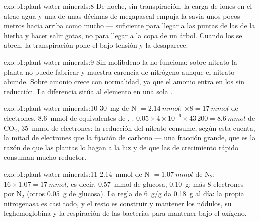 \begin{solution}{exo:b1:plant-water-minerals:8}
De noche, sin transpiración, la carga de iones en el  atrae agua y una
 de unas décimas de megapascal empuja la savia unos pocos
metros hacia arriba como mucho --- suficiente para llegar a las puntas de
las  de la hierba y hacer salir gotas, no para llegar a la copa de un
árbol. Cuando los  se abren, la transpiración pone el  bajo
tensión y la  desaparece.
\end{solution}

\begin{solution}{exo:b1:plant-water-minerals:9}
Sin molibdeno la  no funciona: sobre nitrato la planta no
puede fabricar  y muestra carencia de nitrógeno aunque el nitrato
abunde. Sobre amonio crece con normalidad, ya que el amonio entra en los
 sin reducción. La diferencia sitúa al elemento en una sola
.
\end{solution}

\begin{solution}{exo:b1:plant-water-minerals:10}
\qty{30}{mg} de N $= \qty{2.14}{mmol}$; $\times 8 = \qty{17}{mmol}$ de
electrones, \qty{8.6}{mmol} de equivalentes de . : $0.05\times
4\times 10^{-6}\times 43\,200 = \qty{8.6}{mmol}$ de $\mathrm{CO_2}$,
\qty{35}{mmol} de electrones: la reducción del nitrato consume, según esta
cuenta, la mitad de electrones que la fijación de carbono --- una fracción
grande, que es la razón de que las plantas lo hagan a la luz y de que las
 de crecimiento rápido consuman mucho reductor.
\end{solution}

\begin{solution}{exo:b1:plant-water-minerals:11}
\qty{2.14}{mmol} de N $= \qty{1.07}{mmol}$ de $\mathrm{N_2}$:  $16\times 1.07 = \qty{17}{mmol}$, es decir, \qty{0.57}{mmol} de glucosa,
\qty{0.10}{g}; más 8 electrones por $\mathrm{N_2}$ (otros \qty{0.05}{g} de
glucosa). La regla de \qty{6}{g/g} da \qty{0.18}{g} al día: la propia
nitrogenasa es casi todo, y el resto es construir y mantener los nódulos, su
leghemoglobina y la respiración de las bacterias para mantener bajo el
oxígeno.
\end{solution}

